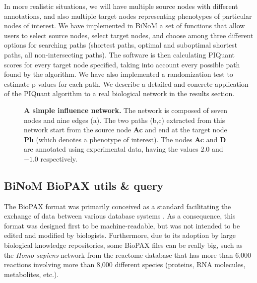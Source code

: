 \documentclass[10pt]{bmc_article}
\newenvironment{bmcformat}{\baselineskip20pt\sloppy\setboolean{publ}{false}}{\baselineskip20pt\sloppy}
\begin{document}
\begin{bmcformat}
In more realistic situations, we will have multiple source nodes with different
 annotations, and also multiple target nodes representing phenotypes of
particular nodes of interest. We have implemented in BiNoM a set of functions
that allow users to select source nodes, select target nodes, and choose among
three different options for searching paths (shortest paths, optimal and
suboptimal shortest paths, all non-intersecting paths). The software is then
calculating PIQuant scores for every target node specified, taking into account
every possible path found by the algorithm. We have also implemented a
randomization test to estimate p-values for each path. We describe a detailed
and concrete application of the PIQuant algorithm to a real biological network
in the results section.

\begin{figure}[h]
 \caption{\label{piquantnetworks}  \textbf{A simple influence network.} The 
network is composed of seven nodes and nine edges (a). The two paths (b,c)
extracted from this network start from the source node \textbf{Ac} and end at
the target node \textbf{Ph} (which denotes a phenotype of interest). The nodes
\textbf{Ac} and \textbf{D} are annotated using experimental data, having the
values $2.0$ and $-1.0$ respectively.}
\end{figure}

\subsection*{BiNoM BioPAX utils \& query}
The BioPAX format was primarily conceived as a standard facilitating the
exchange of data between various database systems \cite{demir2010biopax}. As a
consequence, this format was designed first to be machine-readable, but was not
intended
to be edited and modified by biologists. Furthermore, due to its adoption by
large biological knowledge repositories, some BioPAX files can be really big,
such as the \textit{Homo sapiens} network from the reactome database
\cite{joshi2005reactome} that has more than 6,000 reactions involving more than
8,000 different species (proteins, RNA molecules, metabolites, etc.).


\end{bmcformat}
\end{document}
